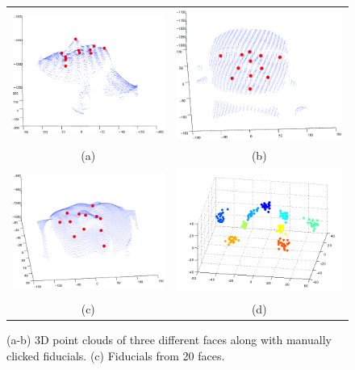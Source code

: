 \documentclass[runningheads]{llncs}
\begin{document}
\begin{figure}[h]
\centering
\begin{tabular}{cc}
\includegraphics[width=.3\linewidth]{resources/figures/face1.png} &
\includegraphics[width=.3\linewidth]{resources/figures/face2.png} \\
(a) & (b) \\
\includegraphics[width=.3\linewidth]{resources/figures/face3.png} &
\includegraphics[width=.5\linewidth]{resources/figures/fiducial_clusters.png} \\
(c) & (d)
\end{tabular}
\caption{(a-b) 3D point clouds of three different faces along with manually clicked fiducials.  (c) Fiducials from 20 faces.}
\label{fig:fiducial_clusters}
\end{figure}
\end{document}
